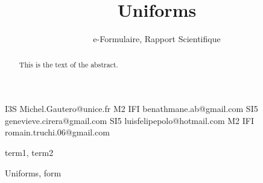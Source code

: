 \documentclass{sigplanconf}
\begin{document}
\setlength{\pdfpageheight}{\paperheight}
\setlength{\pdfpagewidth}{\paperwidth}




\permissiontopublish             %


\title{Uniforms}
\subtitle{e-Formulaire, Rapport Scientifique}

           {I3S}
           {Michel.Gautero@unice.fr}
           {M2 IFI}
           {benathmane.ab@gmail.com}
           {SI5}
           {genevieve.cirera@gmail.com}
           {SI5}
           {luisfelipepolo@hotmail.com}
           {M2 IFI}
           {romain.truchi.06@gmail.com}

\maketitle

\begin{abstract}
This is the text of the abstract.
\end{abstract}


\terms
term1, term2

\keywords
Uniforms, form

\end{document}
